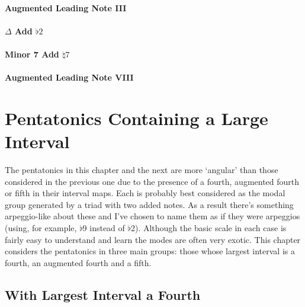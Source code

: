 \documentclass[english]{./gbook}
\begin{document}
\begin{large}
\subsubsection{Augmented Leading Note III}

\subsubsection{$\Delta$ Add $\flat2$}

\subsubsection{Minor 7 Add $\natural7$}

\subsubsection{Augmented Leading Note VIII}


\chapter{\mbox{Pentatonics} \mbox{Containing} \mbox{a} \mbox{Large} \mbox{Interval}}

The pentatonics in this chapter and the next are more `angular' than those considered in the previous one due to the presence of a fourth, augmented fourth or fifth in their interval maps. Each is probably best considered as the modal group generated by a triad with two added notes. As a result there's something arpeggio-like about these and I've chosen to name them as if they were arpeggios (using, for example, $\flat$9 instead of $\flat$2). Although the basic scale in each case is fairly easy to understand and learn the modes are often very exotic. This chapter considers the pentatonics in three main groups: those whose largest interval is a fourth, an augmented fourth and a fifth.

\section{With Largest Interval a Fourth}


\end{large}
\end{document}
